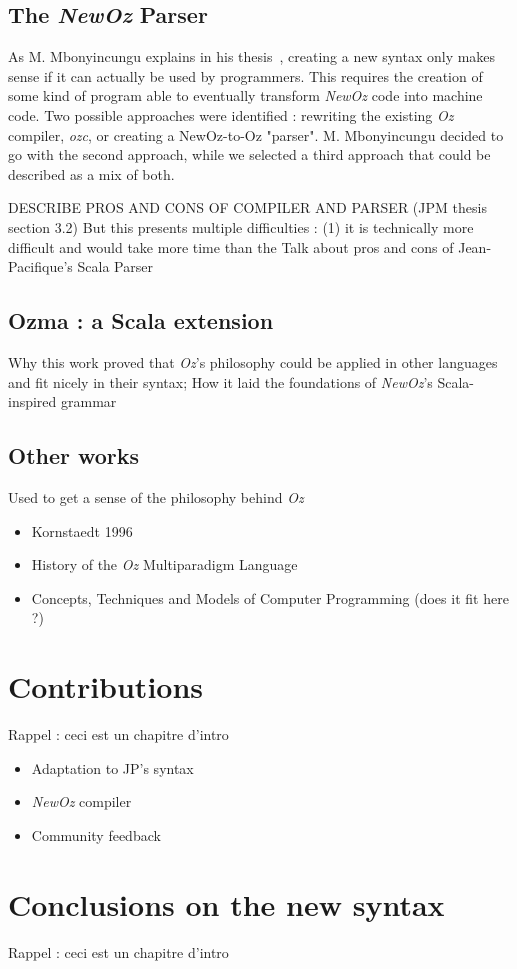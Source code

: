 \subsection{The \textit{NewOz} Parser}\label{subsec:ch1-2-1}
As M. Mbonyincungu explains in his thesis~\cite{jpthesis}, creating a new syntax only makes sense if it can actually be used by programmers.
This requires the creation of some kind of program able to eventually transform \textit{NewOz} code into machine code.
Two possible approaches were identified : rewriting the existing \textit{Oz} compiler, \textit{ozc}, or creating a NewOz-to-Oz "parser".
M. Mbonyincungu decided to go with the second approach, while we selected a third approach that could be described as a mix of both.

DESCRIBE PROS AND CONS OF COMPILER AND PARSER (JPM thesis section 3.2)
But this presents multiple difficulties : (1) it is technically more difficult and would take more time than the
Talk about pros and cons of Jean-Pacifique's Scala Parser

\subsection{Ozma : a Scala extension}\label{subsec:ch1-2-2}
Why this work proved that \textit{Oz}'s philosophy could be applied in other languages and fit nicely in their syntax;
How it laid the foundations of \textit{NewOz}'s Scala-inspired grammar

\subsection{Other works}\label{subsec:ch1-2-3}
Used to get a sense of the philosophy behind \textit{Oz}
\begin{itemize}
    \item Kornstaedt 1996
    \item History of the \textit{Oz} Multiparadigm Language
    \item Concepts, Techniques and Models of Computer Programming (does it fit here ?)
\end{itemize}

\section{Contributions}\label{sec:ch1-3}
Rappel : ceci est un chapitre d'intro
\begin{itemize}
    \item Adaptation to JP's syntax
    \item \textit{NewOz} compiler
    \item Community feedback
\end{itemize}

\section{Conclusions on the new syntax}\label{sec:ch1-4}
Rappel : ceci est un chapitre d'intro